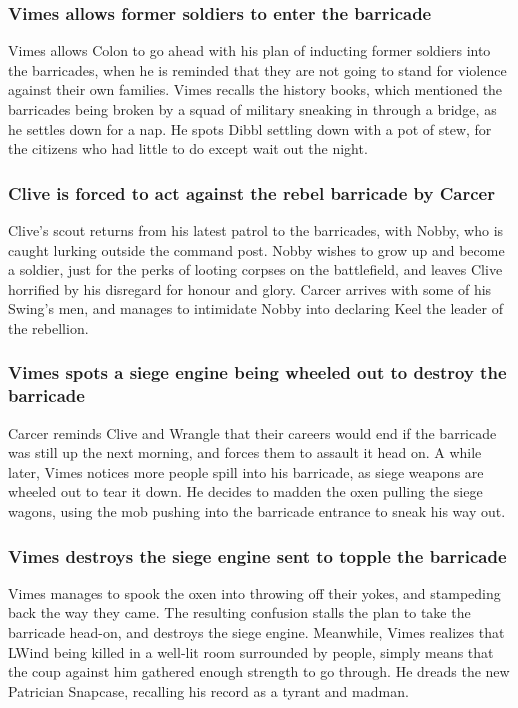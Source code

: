 \subsubsection{\Gls{Vimes} allows former soldiers to enter the barricade}
\Gls{Vimes} allows \Gls{Colon} to go ahead with his plan of inducting former soldiers into the
barricades, when he is reminded that they are not going to stand for violence against their own
families. \Gls{Vimes} recalls the history books, which mentioned the barricades being broken by a
squad of military sneaking in through a bridge, as he settles down for a nap. He spots \Gls{Dibbl}
settling down with a pot of stew, for the citizens who had little to do except wait out the night.

\subsubsection{\Gls{Clive} is forced to act against the rebel barricade by \Gls{Carcer}}
\Gls{Clive}'s scout returns from his latest patrol to the barricades, with \Gls{Nobby}, who is
caught lurking outside the command post. \Gls{Nobby} wishes to grow up and become a soldier, just
for the perks of looting corpses on the battlefield, and leaves \Gls{Clive} horrified by his
disregard for honour and glory. \Gls{Carcer} arrives with some of his \Gls{Swing}'s men, and manages
to intimidate \Gls{Nobby} into declaring \Gls{Keel} the leader of the rebellion.

\subsubsection{\Gls{Vimes} spots a siege engine being wheeled out to destroy the barricade}
\Gls{Carcer} reminds \Gls{Clive} and \Gls{Wrangle} that their careers would end if the barricade was
still up the next morning, and forces them to assault it head on. A while later, \Gls{Vimes} notices
more people spill into his barricade, as siege weapons are wheeled out to tear it down. He decides
to madden the oxen pulling the siege wagons, using the mob pushing into the barricade entrance to
sneak his way out.

\subsubsection{\Gls{Vimes} destroys the siege engine sent to topple the barricade}
\Gls{Vimes} manages to spook the oxen into throwing off their yokes, and stampeding back the way
they came. The resulting confusion stalls the plan to take the barricade head-on, and destroys the
siege engine. Meanwhile, \Gls{Vimes} realizes that \Gls{LWind} being killed in a well-lit room
surrounded by people, simply means that the coup against him gathered enough strength to go through.
He dreads the new Patrician \Gls{Snapcase}, recalling his record as a tyrant and madman.

